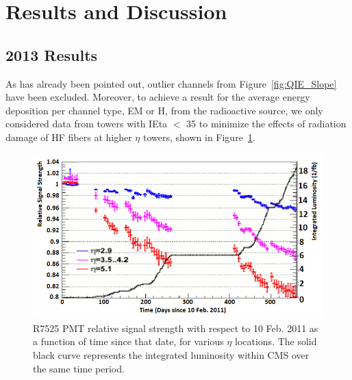 \section{Results and Discussion}
\subsection{2013 Results}
As has already been pointed out, outlier channels from Figure~\ref{fig:QIE_Slope} have been excluded.
Moreover, to achieve a result for the average energy deposition per channel type,
EM or H, from the radioactive source, we only considered data from towers with
IEta $<$ 35 to minimize the effects of radiation damage of HF fibers at higher $\eta$ towers, shown in Figure~\ref{fig:PMT_Drift}.
\begin{figure}[htb]
   \begin{center}
      \includegraphics[width=.9\textwidth]{figures/ch_hfcalibration/PMT_Drift.png}
      \caption{R7525 PMT relative signal strength with respect to 10 Feb. 2011 as a
      function of time since that date, for various $\eta$ locations. The solid
      black curve represents the integrated luminosity within CMS over the same
      time period.}
      \label{fig:PMT_Drift}
   \end{center}
\end{figure}

